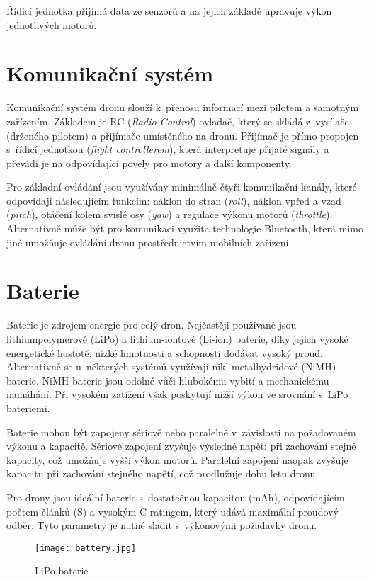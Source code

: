 \documentclass[12pt]{report}
\begin{document}
Řídicí jednotka přijímá data ze senzorů a na jejich základě upravuje výkon jednotlivých motorů. \cite{mainbook}

\section[Komunikační systém]{Komunikační systém}
Komunikační systém dronu slouží k~přenosu informací mezi pilotem a samotným zařízením. Základem je RC (\textit{Radio Control}) ovladač, který se skládá z~vysílače (drženého pilotem) a přijímače umístěného na dronu. Přijímač je přímo propojen s~řídicí jednotkou (\textit{flight controllerem}), která interpretuje přijaté signály a převádí je na odpovídající povely pro motory a další komponenty.

Pro základní ovládání jsou využívány minimálně čtyři komunikační kanály, které odpovídají následujícím funkcím: náklon do stran (\textit{roll}), náklon vpřed a vzad (\textit{pitch}), otáčení kolem svislé osy (\textit{yaw}) a regulace výkonu motorů (\textit{throttle}). Alternativně může být pro komunikaci využita technologie Bluetooth, která mimo jiné umožňuje ovládání dronu prostřednictvím mobilních zařízení.

\section[Baterie]{Baterie}

Baterie je zdrojem energie pro celý dron. Nejčastěji používané jsou lithiumpolymerové (LiPo) a lithium-iontové (Li-ion) baterie, díky jejich vysoké energetické hustotě, nízké hmotnosti a schopnosti dodávat vysoký proud. Alternativně se u~některých systémů využívají nikl-metalhydridové (NiMH) baterie. NiMH baterie jsou odolné vůči hlubokému vybití a mechanickému namáhání. Při vysokém zatížení však poskytují nižší výkon ve srovnání s~LiPo bateriemi.

Baterie mohou být zapojeny sériově nebo paralelně v~závislosti na požadovaném výkonu a kapacitě. Sériové zapojení zvyšuje výsledné napětí při zachování stejné kapacity, což umožňuje vyšší výkon motorů. Paralelní zapojení naopak zvyšuje kapacitu při zachování stejného napětí, což prodlužuje dobu letu dronu.

Pro drony jsou ideální baterie s~dostatečnou kapacitou (mAh), odpovídajícím počtem článků (S) a vysokým C-ratingem, který udává maximální proudový odběr. Tyto parametry je nutné sladit s~výkonovými požadavky dronu. \cite{mainbook}

\begin{figure}[H]
	\centering
	\texttt{[image: battery.jpg]}
	\caption{LiPo baterie \cite{dojo}}
	\label{fig:battery.jpg}
\end{figure}
\end{document}

